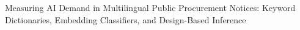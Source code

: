Measuring AI Demand in Multilingual Public Procurement Notices: Keyword Dictionaries, Embedding Classifiers, and Design-Based Inference
